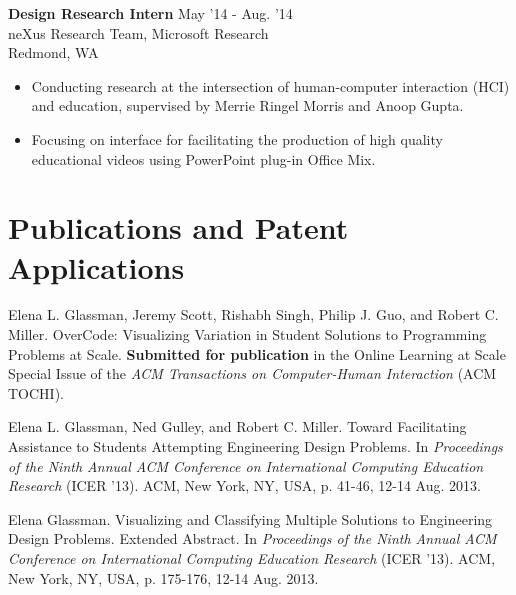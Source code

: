 \documentclass[margin]{res}
\begin{document}
\begin{resume}
{\bf Design Research Intern} \hfill May '14 - Aug. '14 \\ neXus Research Team, Microsoft Research \\ Redmond, WA 
 \begin{itemize} \itemsep -2pt  %
 \item Conducting research at the intersection of human-computer interaction (HCI) and education, supervised by Merrie Ringel Morris and Anoop Gupta. 
 \item Focusing on interface for facilitating the production of high quality educational videos using PowerPoint plug-in Office Mix.

\end{itemize}
 
\section{Publications and Patent Applications}


Elena L. Glassman, Jeremy Scott, Rishabh Singh, Philip J. Guo, and Robert C. Miller. OverCode: Visualizing Variation in Student Solutions to Programming Problems at Scale. {\bf Submitted for publication} in the Online Learning at Scale Special Issue of the {\it ACM Transactions on Computer-Human Interaction} (ACM TOCHI).

Elena L. Glassman, Ned Gulley, and Robert C. Miller. Toward Facilitating Assistance to Students Attempting Engineering Design Problems. In {\it Proceedings of the Ninth Annual ACM Conference on International Computing Education Research} (ICER '13). ACM, New York, NY, USA, p. 41-46, 12-14 Aug. 2013.


Elena Glassman. Visualizing and Classifying Multiple Solutions to Engineering Design Problems. Extended Abstract. In {\it Proceedings of the Ninth Annual ACM Conference on International Computing Education Research} (ICER '13). ACM, New York, NY, USA, p. 175-176, 12-14 Aug. 2013.


\end{resume}
\end{document}
